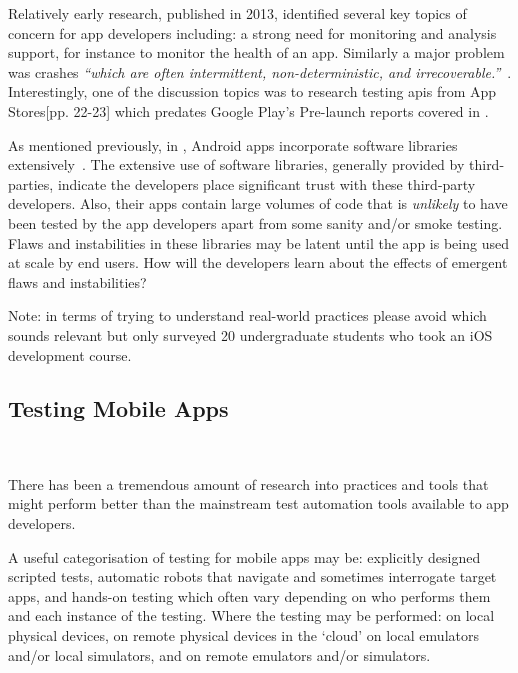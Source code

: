 Relatively early research, published in 2013, identified several key topics of concern for app developers including: a strong need for monitoring and analysis support, for instance to monitor the health of an app. Similarly a major problem was crashes \emph{``which are often intermittent, non-deterministic, and irrecoverable.''}~. Interestingly, one of the discussion topics was to research testing \acrshort{api}s from App Stores[pp. 22-23] which predates Google Play's Pre-launch reports covered in .


As mentioned previously, in , Android apps incorporate software libraries extensively~. The extensive use of software libraries, generally provided by third-parties, indicate the developers place significant trust with these third-party developers. Also, their apps contain large volumes of code that is \emph{unlikely} to have been tested by the app developers apart from some sanity and/or smoke testing. Flaws and instabilities in these libraries may be latent until the app is being used at scale by end users. How will the developers learn about the effects of emergent flaws and instabilities?

Note: in terms of trying to understand real-world practices please avoid \textcite{santos2016_investigating_the_adoption_of_agile_practices_by_20_undergrad_students_in_mobile_app_devt} which sounds relevant but only surveyed 20 undergraduate students who took an iOS development course. 

\subsection{Testing Mobile Apps}~\label{rw-testing-mobile-apps-topic}

There has been a tremendous amount of research into practices and tools that might perform better than the mainstream test automation tools available to app developers.

A useful categorisation of testing for mobile apps may be: 
explicitly designed scripted tests, 
automatic robots that navigate and sometimes interrogate target apps, and 
hands-on testing which often vary depending on who performs them and each instance of the testing. 
Where the testing may be performed:
on local physical devices,
on remote physical devices in the `cloud'
on local emulators and/or local simulators, and
on remote emulators and/or simulators.


